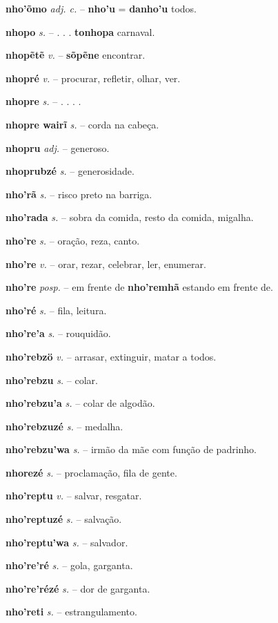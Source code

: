\textbf{nho'õmo} \textit{adj. c.} -- \textbf{nho'u} = \textbf{danho'u} todos.

\textbf{nhopo} \textit{s.} -- . . .  \textbf{tonhopa} carnaval.

\textbf{nhopẽtẽ} \textit{v.} -- \textbf{sõpẽne} encontrar.

\textbf{nhopré} \textit{v.} -- procurar, refletir, olhar, ver.

\textbf{nhopre} \textit{s.} -- . . . .

\textbf{nhopre wairĩ} \textit{s.} -- corda na cabeça.

\textbf{nhopru} \textit{adj.} -- generoso.

\textbf{nhoprubzé} \textit{s.} -- generosidade.

\textbf{nho'rã} \textit{s.} -- risco preto na barriga.

\textbf{nho'rada} \textit{s.} -- sobra da comida, resto da comida, migalha.

\textbf{nho're} \textit{s.} -- oração, reza, canto.

\textbf{nho're} \textit{v.} -- orar, rezar, celebrar, ler, enumerar.

\textbf{nho're} \textit{posp.} -- em frente de  \textbf{nho'remhã} estando em frente de.

\textbf{nho'ré} \textit{s.} -- fila, leitura.

\textbf{nho're'a} \textit{s.} -- rouquidão.

\textbf{nho'rebzö} \textit{v.} -- arrasar, extinguir, matar a todos.

\textbf{nho'rebzu} \textit{s.} -- colar.

\textbf{nho'rebzu'a} \textit{s.} -- colar de algodão.

\textbf{nho'rebzuzé} \textit{s.} -- medalha.

\textbf{nho'rebzu'wa} \textit{s.} -- irmão da mãe com função de padrinho.

\textbf{nhorezé} \textit{s.} -- proclamação, fila de gente.

\textbf{nho'reptu} \textit{v.} -- salvar, resgatar.

\textbf{nho'reptuzé} \textit{s.} -- salvação.

\textbf{nho'reptu'wa} \textit{s.} -- salvador.

\textbf{nho're'ré} \textit{s.} -- gola, garganta.

\textbf{nho're'rézé} \textit{s.} -- dor de garganta.

\textbf{nho'reti} \textit{s.} -- estrangulamento.

